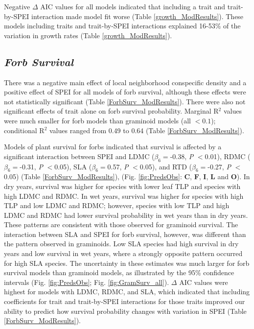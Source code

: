 \documentclass[12pt, letterpaper]{article}
\begin{document}
Negative $\Delta$ AIC values for all models indicated that including a trait and trait-by-SPEI interaction made model fit worse (Table \ref{growth_ModResults}). These models including traits and trait-by-SPEI interactions explained 16-53\% of the variation in growth rates (Table \ref{growth_ModResults}). 

\subsection{\textit{Forb Survival}} 
There was a negative main effect of local neighborhood conspecific density and a positive effect of SPEI for all models of forb survival, although these effects were not statistically significant (Table \ref{ForbSurv_ModResults}). There were also not significant effects of trait alone on forb survival probability. Marginal R$^2$ values were much smaller for forb models than graminoid models (all $<0.1$); conditional R$^2$ values ranged from 0.49 to 0.64 (Table \ref{ForbSurv_ModResults}).

Models of plant survival for forbs indicated that survival is affected by a significant interaction between SPEI and LDMC ($\beta_6=$-0.38,  \textit{P} $<$0.01), RDMC ($\beta _6=$-0.31,  \textit{P} $<$0.05), SLA ($\beta _6=$0.57,  \textit{P} $<$0.05), and RTD ($\beta _6=$-0.27,  \textit{P} $<$0.05) (Table \ref{ForbSurv_ModResults}), (Fig. \ref{fig:PredsObs}: \textbf{C}, \textbf{F}, \textbf{I}, \textbf{L} and \textbf{O}). In dry years, survival was higher for species with lower leaf TLP and species with high LDMC and RDMC. In wet years, survival was higher for species with high TLP and low LDMC and RDMC; however, species with low TLP and high LDMC and RDMC had lower survival probability in wet years than in dry years. These patterns are consistent with those observed for graminoid survival. The interaction between SLA and SPEI for forb survival, however, was different than the pattern observed in graminoids. Low SLA species had high survival in dry years and low survival in wet years, where a strongly opposite pattern occurred for high SLA species. The uncertainty in these estimates was much larger for forb survival models than graminoid models, as illustrated by the 95\% confidence intervals (Fig. \ref{fig:PredsObs}; Fig. \ref{fig:GramSurv_all}). $\Delta$ AIC values were highest for models with LDMC, RDMC, and SLA, which indicated that including coefficients for trait and trait-by-SPEI interactions for those traits improved our ability to predict how survival probability changes with variation in SPEI (Table \ref{ForbSurv_ModResults}).
\end{document}
